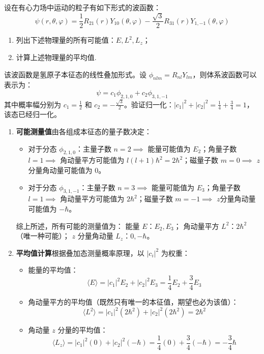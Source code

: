 \begin{exercise}\label{ex:25.7}
设在有心力场中运动的粒子有如下形式的波函数：
$$ \psi(r, \theta, \varphi) = \frac{1}{2} R_{21}(r) Y_{10}(\theta, \varphi) - \frac{\sqrt{3}}{2} R_{31}(r) Y_{1,-1}(\theta, \varphi) $$
\begin{enumerate}
  \item[(a)] 列出下述物理量的所有可能值：$E, L^2, L_z$；
  \item[(b)] 计算上述物理量的平均值.
\end{enumerate}
\end{exercise}
\begin{solution}
该波函数是氢原子本征态的线性叠加形式。设 $\phi_{nlm} = R_{nl} Y_{lm}$，则体系波函数可以表示为：
$$ \psi = c_1 \phi_{2,1,0} + c_2 \phi_{3,1,-1} $$
其中概率幅分别为 $c_1 = \frac{1}{2}$ 和 $c_2 = -\frac{\sqrt{3}}{2}$。验证归一化：$|c_1|^2 + |c_2|^2 = \frac{1}{4} + \frac{3}{4} = 1$，该态已经归一化。

\begin{enumerate}
    \item[(a)] \textbf{可能测量值}由各组成本征态的量子数决定：
    \begin{itemize}
        \item 对于分态 $\phi_{2,1,0}$：主量子数 $n=2 \implies$ 能量可能值为 $E_2$；角量子数 $l=1 \implies$ 角动量平方可能值为 $l(l+1)\hbar^2 = 2\hbar^2$；磁量子数 $m=0 \implies$ $z$分量角动量可能值为 $0$。
        \item 对于分态 $\phi_{3,1,-1}$：主量子数 $n=3 \implies$ 能量可能值为 $E_3$；角量子数 $l=1 \implies$ 角动量平方可能值为 $2\hbar^2$；磁量子数 $m=-1 \implies$ $z$分量角动量可能值为 $-\hbar$。
    \end{itemize}
    综上所述，所有可能的测量值为：
    能量 $E$：$E_2, E_3$；
    角动量平方 $L^2$：$2\hbar^2$（唯一种可能）；
    $z$ 分量角动量 $L_z$：$0, -\hbar$。

    \item[(b)] \textbf{平均值计算}根据叠加态测量概率原理，以 $|c_i|^2$ 为权重：
    \begin{itemize}
        \item 能量的平均值：
        $$ \langle E \rangle = |c_1|^2 E_2 + |c_2|^2 E_3 = \frac{1}{4} E_2 + \frac{3}{4} E_3 $$
        \item 角动量平方的平均值（既然只有唯一的本征值，期望也必为该值）：
        $$ \langle L^2 \rangle = |c_1|^2 (2\hbar^2) + |c_2|^2 (2\hbar^2) = 2\hbar^2 $$
        \item 角动量 $z$ 分量的平均值：
        $$ \langle L_z \rangle = |c_1|^2 (0) + |c_2|^2 (-\hbar) = \frac{1}{4}(0) + \frac{3}{4}(-\hbar) = -\frac{3}{4}\hbar $$
    \end{itemize}
\end{enumerate}
\end{solution}

